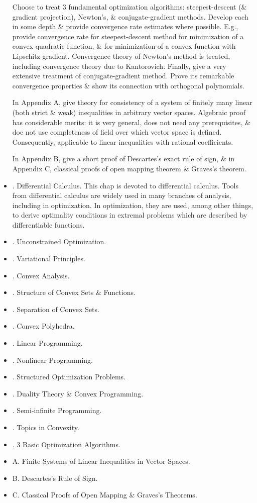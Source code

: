 \documentclass{article}
\begin{document}
\begin{itemize}
    Choose to treat 3 fundamental optimization algorithms: steepest-descent (\& gradient projection), Newton's, \& conjugate-gradient methods. Develop each in some depth \& provide convergence rate estimates where possible. E.g., provide convergence rate for steepest-descent method for minimization of a convex quadratic function, \& for minimization of a convex function with Lipschitz gradient. Convergence theory of Newton's method is treated, including convergence theory due to {\sc Kantorovich}. Finally, give a very extensive treatment of conjugate-gradient method. Prove its remarkable convergence properties \& show its connection with orthogonal polynomials.

    In Appendix A, give theory for consistency of a system of finitely many linear (both strict \& weak) inequalities in arbitrary vector spaces. Algebraic proof has considerable merits: it is very general, does not need any prerequisites, \& doe not use completeness of field over which vector space is defined. Consequently, applicable to linear inequalities with rational coefficients.

    In Appendix B, give a short proof of Descartes's exact rule of sign, \& in Appendix C, classical proofs of open mapping theorem \& Graves's theorem.
    \item {. Differential Calculus.} This chap is devoted to differential calculus. Tools from differential calculus are widely used in many branches of analysis, including in optimization. In optimization, they are used, among other things, to derive optimality conditions in extremal problems which are described by differentiable functions.

    \item {. Unconstrained Optimization.}
    \item {. Variational Principles.}
    \item {. Convex Analysis.}
    \item {. Structure of Convex Sets \& Functions.}
    \item {. Separation of Convex Sets.}
    \item {. Convex Polyhedra.}
    \item {. Linear Programming.}
    \item {. Nonlinear Programming.}
    \item {. Structured Optimization Problems.}
    \item {. Duality Theory \& Convex Programming.}
    \item {. Semi-infinite Programming.}
    \item {. Topics in Convexity.}
    \item {. 3 Basic Optimization Algorithms.}
    \item {\sf A. Finite Systems of Linear Inequalities in Vector Spaces.}
    \item {\sf B. Descartes's Rule of Sign.}
    \item {\sf C. Classical Proofs of Open Mapping \& Graves's Theorems.}
\end{itemize}
\end{document}
